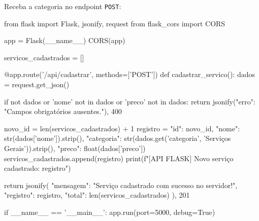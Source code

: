 Receba a categoria no endpoint \texttt{POST}:
\begin{boxCodigoPY}
from flask import Flask, jsonify, request
from flask_cors import CORS

app = Flask(__name__)
CORS(app)

servicos_cadastrados = []

@app.route('/api/cadastrar', methods=['POST'])
def cadastrar_servico():
    dados = request.get_json()
    
    if not dados or 'nome' not in dados or 'preco' not in dados:
        return jsonify({"erro": "Campos obrigatórios ausentes."}), 400

    novo_id = len(servicos_cadastrados) + 1
    registro = {
        "id": novo_id,
        "nome": str(dados['nome']).strip(),
        "categoria": str(dados.get('categoria', 'Serviços Gerais')).strip(),
        "preco": float(dados['preco'])
    }
    servicos_cadastrados.append(registro)
    print(f"[API FLASK] Novo serviço cadastrado: {registro}")

    return jsonify({
        "mensagem": "Serviço cadastrado com sucesso no servidor!",
        "registro": registro,
        "total": len(servicos_cadastrados)
    }), 201

if __name__ == '__main__':
    app.run(port=5000, debug=True)
\end{boxCodigoPY}

\begin{boxAtividade}
\end{boxAtividade}

